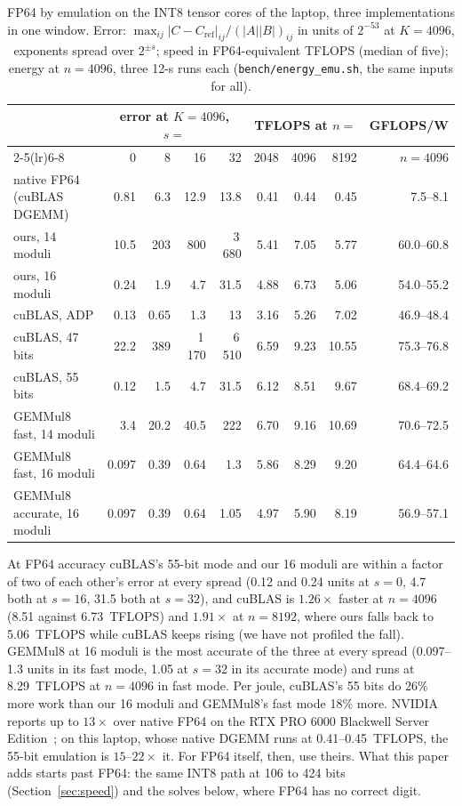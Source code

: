 \documentclass[11pt]{article}
\begin{document}
\begin{table}[h]\centering
\caption{FP64 by emulation on the INT8 tensor cores of the laptop, three implementations in one window. Error:
$\max_{ij}|C-C_{\mathrm{ref}}|_{ij}/(|A||B|)_{ij}$ in units of $2^{-53}$ at $K=4096$, exponents spread over $2^{\pm s}$;
speed in FP64-equivalent TFLOPS (median of five); energy at $n=4096$, three 12-s runs each (\texttt{bench/energy\_emu.sh},
the same inputs for all).}\label{tab:emu}
\small\setlength{\tabcolsep}{3.2pt}
\begin{tabular}{lrrrrrrrr}\toprule
& \multicolumn{4}{c}{error at $K=4096$, $s=$} & \multicolumn{3}{c}{TFLOPS at $n=$} & GFLOPS/W \\
\cmidrule(lr){2-5}\cmidrule(lr){6-8}
& 0 & 8 & 16 & 32 & 2048 & 4096 & 8192 & $n=4096$ \\\midrule
native FP64 (cuBLAS DGEMM) & 0.81 & 6.3 & 12.9 & 13.8 & 0.41 & 0.44 & 0.45 & 7.5--8.1 \\
ours, 14 moduli & 10.5 & 203 & 800 & 3\,680 & 5.41 & 7.05 & 5.77 & 60.0--60.8 \\
ours, 16 moduli & 0.24 & 1.9 & 4.7 & 31.5 & 4.88 & 6.73 & 5.06 & 54.0--55.2 \\
cuBLAS, ADP & 0.13 & 0.65 & 1.3 & 13 & 3.16 & 5.26 & 7.02 & 46.9--48.4 \\
cuBLAS, 47 bits & 22.2 & 389 & 1\,170 & 6\,510 & 6.59 & 9.23 & 10.55 & 75.3--76.8 \\
cuBLAS, 55 bits & 0.12 & 1.5 & 4.7 & 31.5 & 6.12 & 8.51 & 9.67 & 68.4--69.2 \\
GEMMul8 fast, 14 moduli & 3.4 & 20.2 & 40.5 & 222 & 6.70 & 9.16 & 10.69 & 70.6--72.5 \\
GEMMul8 fast, 16 moduli & 0.097 & 0.39 & 0.64 & 1.3 & 5.86 & 8.29 & 9.20 & 64.4--64.6 \\
GEMMul8 accurate, 16 moduli & 0.097 & 0.39 & 0.64 & 1.05 & 4.97 & 5.90 & 8.19 & 56.9--57.1 \\\bottomrule
\end{tabular}
\end{table}
At FP64 accuracy cuBLAS's 55-bit mode and our 16 moduli are within a factor of two of each other's error at every spread
(0.12 and 0.24 units at $s=0$, 4.7 both at $s=16$, 31.5 both at $s=32$), and cuBLAS is $1.26\times$ faster at $n=4096$
(8.51 against 6.73~TFLOPS) and $1.91\times$ at $n=8192$, where ours falls back to 5.06~TFLOPS while cuBLAS keeps rising (we
have not profiled the fall). GEMMul8 at 16 moduli is the most accurate of the three at every spread (0.097--1.3 units in its
fast mode, 1.05 at $s=32$ in its accurate mode) and runs at 8.29~TFLOPS at $n=4096$ in fast mode. Per joule, cuBLAS's 55 bits do 26\% more work than our 16 moduli and GEMMul8's
fast mode 18\% more. NVIDIA reports up to $13\times$ over native FP64 on the RTX PRO 6000 Blackwell Server Edition~\cite{nvemu};
on this laptop, whose native DGEMM runs at 0.41--0.45~TFLOPS, the 55-bit emulation is $15$--$22\times$ it. For FP64 itself,
then, use theirs. What this paper adds starts past FP64: the same INT8 path at 106 to 424 bits (Section~\ref{sec:speed}) and the solves below,
where FP64 has no correct digit.
\end{document}
